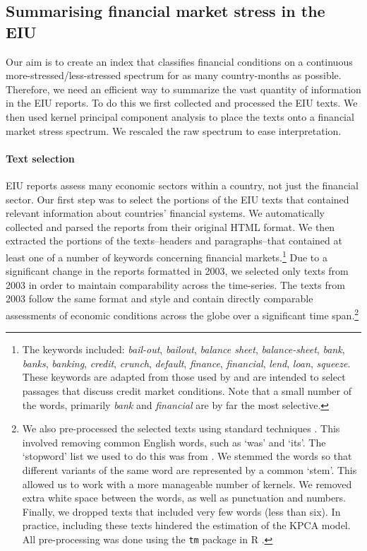 \documentclass[]{article}
\begin{document}
\subsection{Summarising financial market stress in the
EIU}\label{summarizing-financial-market-stress-in-the-eiu}

Our aim is to create an index that classifies financial conditions on a continuous more-stressed/less-stressed spectrum for as many country-months as possible. Therefore, we need an efficient way to summarize the vast quantity of information in the EIU reports. To do this we first collected and processed the EIU texts. We then used kernel principal component analysis to place the texts onto a financial market stress spectrum. We rescaled the raw spectrum to ease interpretation.

\paragraph{Text selection}\label{text-selection}

EIU reports assess many economic sectors within a country,
not just the financial sector.
Our first step was to select the portions of the EIU texts that contained relevant information about countries' financial systems. We automatically collected and parsed the reports from their original HTML format. We then extracted the portions of the texts--headers and paragraphs--that contained at least one of a number of keywords concerning financial markets.\footnote{The
  keywords included: \emph{bail-out}, \emph{bailout}, \emph{balance
  sheet}, \emph{balance-sheet}, \emph{bank}, \emph{banks},
  \emph{banking}, \emph{credit}, \emph{crunch}, \emph{default},
  \emph{finance}, \emph{financial}, \emph{lend}, \emph{loan},
  \emph{squeeze}. These keywords are adapted
  from those used by \cite{Romer2015} and are intended to
  select passages that discuss credit market conditions. Note that a small number of the words, primarily \emph{bank} and \emph{financial} are by far the most selective.} Due to a significant change in the reports formatted in 2003, we selected only texts from 2003 in order to maintain comparability across the time-series. The texts from 2003 follow the same format and style and contain directly comparable assessments of economic conditions across the globe over a significant time span.\footnote{We also pre-processed the selected texts using standard techniques \citep[see][]{Grimmer2013}. This involved removing common English words, such as `was' and `its'. The `stopword' list we used to do this was from \cite{dhillon:modha:mlj01}. We stemmed the words so that different variants of the same word are represented by a common `stem'. This allowed us to work with a more manageable number of kernels. We removed extra white space between the words, as well as punctuation and numbers. Finally, we dropped texts that included very few words (less than six). In practice, including these texts hindered the estimation of the KPCA model. All pre-processing was done using the \texttt{tm} package \citep{tm2015} in R \citep{R-cite}.}
\end{document}
